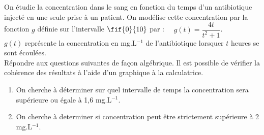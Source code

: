 \documentclass[a4paper,11pt,exos]{nsi} %
\begin{document}
\maketitle

On étudie la concentration dans le sang en fonction du temps d'un antibiotique injecté en une seule prise à un patient. On modélise cette concentration par la fonction $g$ définie sur l'intervalle $\fif{0}{10}$ par : $\quad g(t)=\dfrac{4t}{t^2+1}$.\\
$g(t)$ représente la concentration en mg.L$^{-1}$ de l'antibiotique lorsquer $t$ heures se sont écoulées.\\[.5em]
Répondre aux questions suivantes de façon algébrique. Il est possible de vérifier la cohérence des résultats à l'aide d'un graphique à la calculatrice.
\begin{enumerate}
    \item On cherche à déterminer sur quel intervalle de temps la concentration sera supérieure ou égale à 1,6 mg.L$^{-1}$.

    \item On cherche à determiner si concentration peut être strictement supérieure à 2 mg.L$^{-1}$.
\end{enumerate}




\newpage
\end{document}
